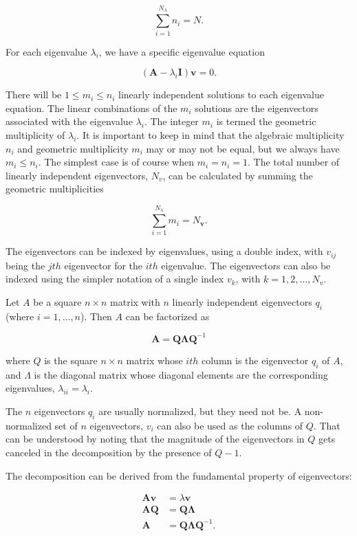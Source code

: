 \documentclass[a4paper]{article}
\begin{document}
\begin{landscape}
\begin{multicols}{2}
$$\sum \limits _{i=1}^{N_{\lambda }}{n_{i}}=N.$$

For each eigenvalue $\lambda_i$, we have a specific eigenvalue equation

$$ \left(\mathbf {A} -\lambda _{i}\mathbf {I} \right)\mathbf {v} =0.$$

There will be $1 \leq m_i \leq n_i$ linearly independent solutions to each eigenvalue equation. The linear combinations of the $m_i$ solutions are the eigenvectors associated with the eigenvalue $\lambda_i$. The integer $m_i$ is termed the geometric multiplicity of $\lambda_i$. It is important to keep in mind that the algebraic multiplicity $n_i$ and geometric multiplicity $m_i$ may or may not be equal, but we always have $m_i \leq n_i$. The simplest case is of course when $m_i = n_i = 1$. The total number of linearly independent eigenvectors, $N_v$, can be calculated by summing the geometric multiplicities

$$\sum \limits _{i=1}^{N_{\lambda }}{m_{i}}=N_{\mathbf {v} }.$$

The eigenvectors can be indexed by eigenvalues, using a double index, with $v_{ij}$ being the $jth$ eigenvector for the $ith$ eigenvalue. The eigenvectors can also be indexed using the simpler notation of a single index $v_k$, with $k = 1, 2, \dots, N_v.$

Let $A$ be a square $n \times n$ matrix with $n$ linearly independent eigenvectors $q_i$ (where $i = 1, \dots, n$). Then $A$ can be factorized as

$$ \mathbf {A} =\mathbf {Q} \mathbf {\Lambda } \mathbf {Q} ^{-1}$$

where $Q$ is the square $n \times n$ matrix whose $ith$ column is the eigenvector $q_i$ of $A$, and $\Lambda$ is the diagonal matrix whose diagonal elements are the corresponding eigenvalues, $\lambda_{ii} = \lambda_i$.

The $n$ eigenvectors $q_i$ are usually normalized, but they need not be. A non-normalized set of $n$ eigenvectors, $v_i$ can also be used as the columns of $Q$. That can be understood by noting that the magnitude of the eigenvectors in $Q$ gets canceled in the decomposition by the presence of $Q-1$.

The decomposition can be derived from the fundamental property of eigenvectors:

$$ {\begin{aligned}\mathbf {A} \mathbf {v} &=\lambda \mathbf {v} \\\mathbf {A} \mathbf {Q} &=\mathbf {Q} \mathbf {\Lambda } \\\mathbf {A} &=\mathbf {Q} \mathbf {\Lambda } \mathbf {Q} ^{-1}.\end{aligned}}$$


\end{multicols}
\end{landscape}
\end{document}
